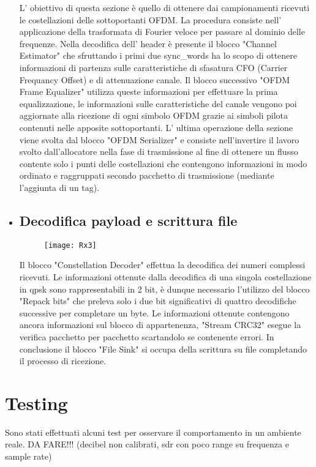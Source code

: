 \begin{itemize}
 	L' obiettivo di questa sezione è quello di ottenere dai campionamenti ricevuti le costellazioni delle sottoportanti OFDM. La procedura consiste nell' applicazione della trasformata di Fourier veloce per passare al dominio delle frequenze. Nella decodifica dell' header è presente il blocco "Channel Estimator" che sfruttando i primi due sync\_words ha lo scopo di ottenere informazioni di partenza sulle caratteristiche di sfasatura CFO (Carrier Frequancy Offset) e di attenuazione canale. Il blocco successivo "OFDM Frame Equalizer" utilizza queste informazioni per effettuare la prima equalizzazione, le informazioni sulle caratteristiche del canale vengono poi aggiornate alla ricezione di ogni simbolo OFDM grazie ai simboli pilota contenuti nelle apposite sottoportanti. L' ultima operazione della sezione viene svolta dal blocco "OFDM Serializer" e consiste nell'invertire il lavoro svolto dall'allocatore nella fase di trasmissione al fine di ottenere un flusso contente solo i punti delle costellazioni che contengono informazioni in modo ordinato e raggruppati secondo pacchetto di trasmissione (mediante l'aggiunta di un tag). 
 	
 	\item \subsection{Decodifica payload e scrittura file}
 	\begin{figure}[h]
 		\centering
 		\texttt{[image: Rx3]}
 		\caption{}
 	\end{figure}
 	Il blocco "Constellation Decoder" effettua la decodifica dei numeri complessi ricevuti. Le informazioni ottenute dalla decodifica di una singola costellazione in qpsk sono rappresentabili in 2 bit, è dunque necessario l'utilizzo del blocco "Repack bits" che preleva solo i due bit significativi di quattro decodifiche successive per completare un byte. Le informazioni ottenute contengono ancora informazioni sul blocco di appartenenza, "Stream CRC32" esegue la verifica pacchetto per pacchetto scartandolo se contenente errori. In conclusione il blocco "File Sink" si occupa della scrittura su file completando il processo di ricezione.
 \end{itemize}
\section{Testing}
 Sono stati effettuati alcuni test per osservare il comportamento in un ambiente reale. DA FARE!!! (decibel non calibrati, sdr con poco range su frequenza e sample rate)
 
